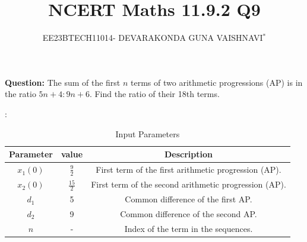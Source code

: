 \documentclass[a4,12pt,onecolumn]{IEEEtran}
\title{
	
	\title{NCERT Maths 11.9.2 Q9}
	\author{EE23BTECH11014- DEVARAKONDA GUNA VAISHNAVI$^{*}$%
	}
	
	
}
\begin{document}
\maketitle
	
\textbf{Question:} 
The sum of the first $n$ terms of two arithmetic progressions (AP) is in the ratio $5n+4 : 9n+6$. Find the ratio of their 18th terms.

\solution:
\fi
\begin{table}[htbp]
	\centering
    \begin{tabular}{|c|c|c|}
    \hline
    \textbf{Parameter} &\textbf{value}& \textbf{Description} \\
    \hline
    \( x_1(0) \) & $\frac{9}{2}$& First term of the first arithmetic progression (AP). \\
    \hline
    \( x_2(0) \) &$\frac{15}{2}$& First term of the second arithmetic progression (AP).  \\
    \hline
    \( d_1 \) & 5 &Common difference of the first AP. \\
    \hline
    \( d_2 \) & 9&Common difference of the second AP. \\
    \hline
    \( n \) & - &Index of the term in the sequences. \\
    \hline
    \end{tabular}
    \label{tab:parameters}
     \caption{Input Parameters}
\end{table}
\end{document}
